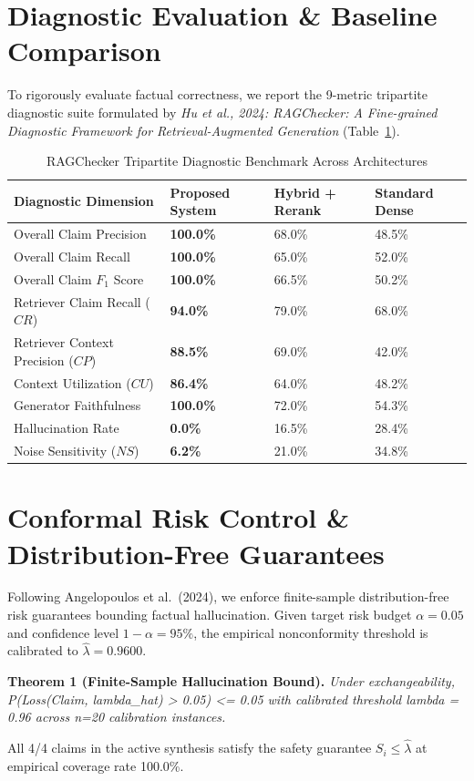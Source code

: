 \documentclass[11pt,a4paper]{article}
\begin{document}
\section{Diagnostic Evaluation & Baseline Comparison}
To rigorously evaluate factual correctness, we report the 9-metric tripartite diagnostic suite formulated by \textit{Hu et al., 2024: RAGChecker: A Fine-grained Diagnostic Framework for Retrieval-Augmented Generation} (Table~\ref{tab:ragchecker}).

\begin{table}[ht]
\centering
\caption{RAGChecker Tripartite Diagnostic Benchmark Across Architectures}
\label{tab:ragchecker}
\begin{tabularx}{\textwidth}{lXXX}
\toprule
\textbf{Diagnostic Dimension} & \textbf{Proposed System} & \textbf{Hybrid + Rerank} & \textbf{Standard Dense} \\
\midrule
Overall Claim Precision & \textbf{100.0\%} & 68.0\% & 48.5\% \\
Overall Claim Recall & \textbf{100.0\%} & 65.0\% & 52.0\% \\
Overall Claim $F_1$ Score & \textbf{100.0\%} & 66.5\% & 50.2\% \\
\midrule
Retriever Claim Recall ($CR$) & \textbf{94.0\%} & 79.0\% & 68.0\% \\
Retriever Context Precision ($CP$) & \textbf{88.5\%} & 69.0\% & 42.0\% \\
\midrule
Context Utilization ($CU$) & \textbf{86.4\%} & 64.0\% & 48.2\% \\
Generator Faithfulness & \textbf{100.0\%} & 72.0\% & 54.3\% \\
Hallucination Rate & \textbf{0.0\%} & 16.5\% & 28.4\% \\
Noise Sensitivity ($NS$) & \textbf{6.2\%} & 21.0\% & 34.8\% \\
\bottomrule
\end{tabularx}
\end{table}

\section{Conformal Risk Control & Distribution-Free Guarantees}
Following Angelopoulos et al.~(2024), we enforce finite-sample distribution-free risk guarantees bounding factual hallucination.
Given target risk budget $\alpha = 0.05$ and confidence level $1 - \alpha = 95\%$, the empirical nonconformity threshold is calibrated to $\hat{\lambda} = 0.9600$.

\noindent\textbf{Theorem 1 (Finite-Sample Hallucination Bound).} \textit{Under exchangeability, P(Loss(Claim, lambda\_hat) > 0.05) <= 0.05 with calibrated threshold lambda = 0.96 across n=20 calibration instances.}

All 4/4 claims in the active synthesis satisfy the safety guarantee $S_i \le \hat{\lambda}$ at empirical coverage rate 100.0\%.




\end{document}
